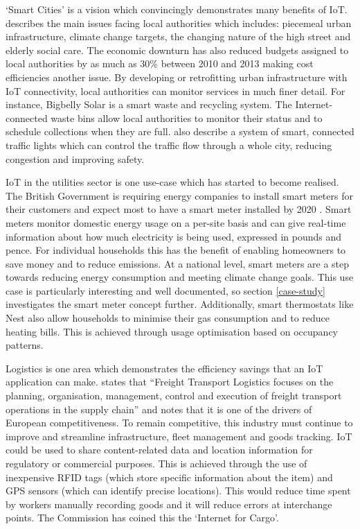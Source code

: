     `Smart Cities' is a vision which convincingly demonstrates many benefits of IoT. \citet{DfBIS:2013} describes the main issues facing local authorities which includes: piecemeal urban infrastructure, climate change targets, the changing nature of the high street and elderly social care. The economic downturn has also reduced budgets assigned to local authorities by as much as 30\% between 2010 and 2013 making cost efficiencies another issue. By developing or retrofitting urban infrastructure with IoT connectivity, local authorities can monitor services in much finer detail. For instance, Bigbelly Solar is a smart waste and recycling system. The Internet-connected waste bins allow local authorities to monitor their status and to schedule collections when they are full. \citet{fog:2012} also describe a system of smart, connected traffic lights which can control the traffic flow through a whole city, reducing congestion and improving safety.  

    IoT in the utilities sector is one use-case which has started to become realised. The British Government is requiring energy companies to install smart meters for their customers and expect most to have a smart meter installed by 2020 \citep{DoECC:2013}. Smart meters monitor domestic energy usage on a per-site basis and can give real-time information about how much electricity is being used, expressed in pounds and pence. For individual households this has the benefit of enabling homeowners to save money and to reduce emissions. At a national level, smart meters are a step towards reducing energy consumption and meeting climate change goals. This use case is particularly interesting and well documented, so section \ref{case-study} investigates the smart meter concept further. Additionally, smart thermostats like Nest also allow households to minimise their gas consumption and to reduce heating bills. This is achieved through usage optimisation based on occupancy patterns. 

    Logistics is one area which demonstrates the efficiency savings that an IoT application can make. \citet{ECFreight:2007} states that ``Freight Transport Logistics focuses on the planning, organisation, management, control and execution of freight transport operations in the supply chain'' and notes that it is one of the drivers of European competitiveness. To remain competitive, this industry must continue to improve and streamline infrastructure, fleet management and goods tracking. IoT could be used to share content-related data and location information for regulatory or commercial purposes. This is achieved through the use of inexpensive RFID tags (which store specific information about the item) and GPS sensors (which can identify precise locations). This would reduce time spent by workers manually recording goods and it will reduce errors at interchange points. The Commission has coined this the `Internet for Cargo'.

